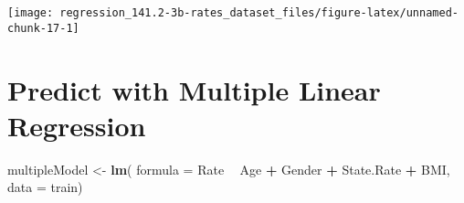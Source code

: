 \documentclass[]{book}
\newenvironment{Shaded}{\begin{snugshade}}{\end{snugshade}}
\newcommand{\CommentTok}[1]{\textcolor[rgb]{0.56,0.35,0.01}{\textit{#1}}}
\newcommand{\DataTypeTok}[1]{\textcolor[rgb]{0.13,0.29,0.53}{#1}}
\newcommand{\DecValTok}[1]{\textcolor[rgb]{0.00,0.00,0.81}{#1}}
\newcommand{\KeywordTok}[1]{\textcolor[rgb]{0.13,0.29,0.53}{\textbf{#1}}}
\newcommand{\NormalTok}[1]{#1}
\newcommand{\OperatorTok}[1]{\textcolor[rgb]{0.81,0.36,0.00}{\textbf{#1}}}
\newcommand{\StringTok}[1]{\textcolor[rgb]{0.31,0.60,0.02}{#1}}
\begin{document}
\begin{Shaded}
\end{Shaded}

\begin{center}\texttt{[image: regression\_141.2-3b-rates\_dataset\_files/figure-latex/unnamed-chunk-17-1]} \end{center}

\begin{Shaded}
\end{Shaded}

\hypertarget{predict-with-multiple-linear-regression}{%
\section{Predict with Multiple Linear Regression}\label{predict-with-multiple-linear-regression}}

\begin{Shaded}
\begin{Highlighting}[]
\NormalTok{multipleModel <-}\StringTok{ }\KeywordTok{lm}\NormalTok{(}
  \DataTypeTok{formula =}\NormalTok{ Rate }\OperatorTok{~}\StringTok{ }\NormalTok{Age }\OperatorTok{+}\StringTok{ }\NormalTok{Gender }\OperatorTok{+}\StringTok{ }\NormalTok{State.Rate }\OperatorTok{+}\StringTok{ }\NormalTok{BMI,}
  \DataTypeTok{data =}\NormalTok{ train)}
\end{Highlighting}
\end{Shaded}
\end{document}
